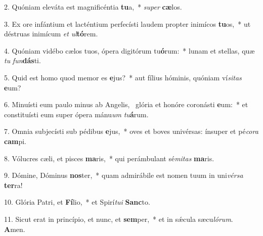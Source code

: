 2. Quóniam eleváta est magnificéntia \textbf{tu}a,~*  \textit{su}\textit{per} \textbf{cæ}los.\

3. Ex ore infántium et lacténtium perfecísti laudem propter inimícos \textbf{tu}os,~*  ut déstruas inimícum \textit{et} \textit{ul}\textbf{tó}rem.\

4. Quóniam vidébo cælos tuos, ópera digitórum tu\textbf{ó}rum:~*  lunam et stellas, quæ \textit{tu} \textit{fun}\textbf{dás}ti.\

5. Quid est homo quod memor es \textbf{e}jus?~*  aut fílius hóminis, quóniam ví\textit{si}\textit{tas} \textbf{e}um?\

6. Minuísti eum paulo minus ab Angelis, \dag\  glória et honóre coronásti \textbf{e}um:~*  et constituísti eum super ópera mánu\textit{um} \textit{tu}\textbf{á}rum.\

7. Omnia subjecísti sub pédibus \textbf{e}jus,~*  oves et boves univérsas: ínsuper et pé\textit{co}\textit{ra} \textbf{cam}pi.\

8. Vólucres cæli, et pisces \textbf{ma}ris,~*  qui perámbulant sé\textit{mi}\textit{tas} \textbf{ma}ris.\

9. Dómine, Dóminus \textbf{nos}ter,~*  quam admirábile est nomen tuum in uni\textit{vér}\textit{sa} \textbf{ter}ra!\

10. Glória Patri, et \textbf{Fí}lio,~*  et Spirí\textit{tu}\textit{i} \textbf{Sanc}to.\

11. Sicut erat in princípio, et nunc, et \textbf{sem}per,~*  et in sǽcula sæcu\textit{ló}\textit{rum}. \textbf{A}men.\

